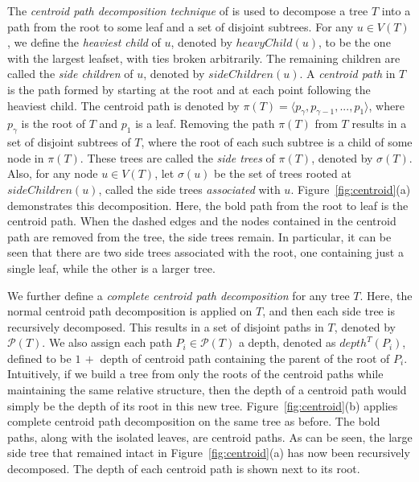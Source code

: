 \documentclass{article}
\begin{document}
    The \textit{centroid path decomposition technique} of \cite{cole2000n} is used to decompose a tree $T$ into a path from the root to some leaf and a set of disjoint subtrees. For any $u \in V(T)$, we define the \textit{heaviest child} of $u$, denoted by $heavyChild(u)$, to be the one with the largest leafset, with ties broken arbitrarily. The remaining children are called the \textit{side children} of $u$, denoted by $sideChildren(u)$. A \textit{centroid path} in $T$ is the path formed by starting at the root and at each point following the heaviest child. The centroid path is denoted by $\pi(T) = \langle p_{\gamma}, p_{\gamma - 1}, ..., p_1 \rangle$, where $p_{\gamma}$ is the root of $T$ and $p_1$ is a leaf. Removing the path $\pi(T)$ from $T$ results in a set of disjoint subtrees of $T$, where the root of each such subtree is a child of some node in $\pi(T)$. These trees are called the \textit{side trees} of $\pi(T)$, denoted by $\sigma(T)$. Also, for any node $u \in V(T)$, let $\sigma(u)$ be the set of trees rooted at $sideChildren(u)$, called the side trees \textit{associated} with $u$. Figure~\ref{fig:centroid}(a) demonstrates this decomposition. Here, the bold path from the root to leaf is the centroid path. When the dashed edges and the nodes contained in the centroid path are removed from the tree, the side trees remain. In particular, it can be seen that there are two side trees associated with the root, one containing just a single leaf, while the other is a larger tree.

    We further define a \textit{complete centroid path decomposition} for any tree $T$. Here, the normal centroid path decomposition is applied on $T$, and then each side tree is recursively decomposed. This results in a set of disjoint paths in $T$, denoted by $\mathcal{P}(T)$. We also assign each path $P_i \in \mathcal{P}(T)$ a depth, denoted as $depth^{T}(P_i)$, defined to be $1\, +$ depth of centroid path containing the parent of the root of $P_i$. Intuitively, if we build a tree from only the roots of the centroid paths while maintaining the same relative structure, then the depth of a centroid path would simply be the depth of its root in this new tree. Figure~\ref{fig:centroid}(b) applies complete centroid path decomposition on the same tree as before. The bold paths, along with the isolated leaves, are centroid paths. As can be seen, the large side tree that remained intact in Figure~\ref{fig:centroid}(a) has now been recursively decomposed. The depth of each centroid path is shown next to its root.
\end{document}
